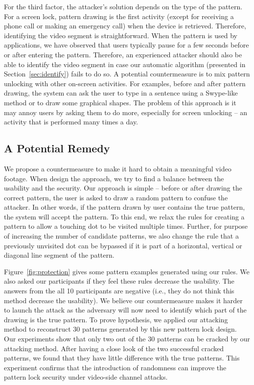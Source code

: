 For the third factor, the attacker's solution depends on the type of the
pattern. For a screen lock, pattern drawing is the first activity (except for
receiving a phone call or making an emergency call) when the device is
retrieved. Therefore, identifying the video segment is straightforward. When
the pattern is used by applications, we have observed that users typically
pause for a few seconds before or after entering the pattern. Therefore, an
experienced attacker should also be able to identify the video segment in
case our automatic algorithm (presented in Section~\ref{sec:identify}) fails
to do so. A potential countermeasure is to mix pattern unlocking with other
on-screen activities. For examples, before and after pattern drawing, the
system can ask the user to type in a sentence using a Swype-like method or to
draw some graphical shapes. The problem of this approach is it may annoy
users by asking them to do more, especially for screen unlocking -- an
activity that is performed
many times a day.


\subsection{A Potential Remedy}
\label{section: potential-remedy}
We propose a countermeasure to make it hard to obtain a meaningful video footage.
When design the approach, we try to find a balance between the usability and the security.
Our approach is simple --
before or after drawing the correct pattern, the user is asked to draw a random pattern to confuse the attacker. In
other words, if the pattern drawn by user contains the true pattern, the system will accept the pattern. To this
end, we relax the rules for creating a pattern to allow a touching dot to be visited multiple times. Further, for
purpose of increasing the number of candidate patterns, we also change the rule that a previously unvisited dot can be
bypassed if it is part of a horizontal, vertical or diagonal line segment of the pattern.


Figure~\ref{fig:protection} gives some pattern examples generated using our rules. We also asked our participants if they feel these rules decrease
the usability. The answers from the all 10 participants are negative (i.e., they do not think this method decrease the usability).
We believe our countermeasure makes it harder to launch the attack as the adversary will now need to
identify which part of the drawing is the true pattern.
To prove hypothesis, we applied our attacking method to reconstruct 30 patterns generated by this new pattern lock design.
Our experiments show that only two out of the 30 patterns can be cracked by our attacking method.
After having a close look of the two successful cracked patterns, we found that they have little difference with the true patterns.
This experiment confirms that the introduction of randomness can improve the pattern lock security under video-side channel attacks.

